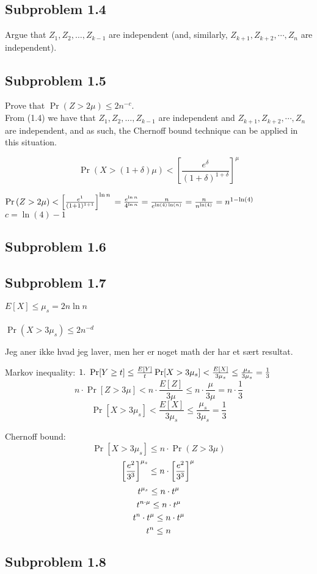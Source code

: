 \documentclass[article,a4paper,oneside]{memoir}
\newcommand{\+}[1]{\ensuremath{\boldsymbol{#1}}}
\begin{document}
\subsection{Subproblem 1.4}
Argue that $Z_1, Z_2, \ldots, Z_{k-1}$ are independent (and, similarly, $Z_{k+1}, Z_{k+2}, \cdots, Z_n$ are independent).

\subsection{Subproblem 1.5}
Prove that $\Pr (Z > 2\mu)\leq 2n^{-c}$.
\\
From (1.4) we have that $Z_1, Z_2, \ldots, Z_{k-1}$ are independent and $Z_{k+1}, Z_{k+2}, \cdots, Z_n$ are independent, and as such, the Chernoff bound technique can be applied in this situation.

$$\Pr \left ( X > (1+\delta)\mu \right ) < \left [ \frac{e^\delta}{(1+\delta)^{1+\delta}} \right ]^\mu$$

$\Pr \left ( Z > 2\mu \right ) < \left [ \frac{e^1}{(1+1)^{1+1}} \right ]^{\ln n}
\\= \frac{e^{\ln n}}{4^{\ln n}} 
\\= \frac {n}{e^{\ln(4)\ln(n)}} 
\\= \frac{n}{n^{\ln(4)}}
\\= n^{1-\ln (4)}$\\
$ c=\ln(4)-1$



\subsection{Subproblem 1.6}

\subsection{Subproblem 1.7}
$E[X] \leq \mu_s = 2n\ln n$
\\\\
$\Pr (X > 3\mu_s) \leq 2n^{-d}$

Jeg aner ikke hvad jeg laver, men her er noget math der har et sært resultat.

Markov inequality:
$
\\1.\ \Pr[Y\geq t]\leq \frac{E[Y]}{t} \\
\Pr[X > 3\mu_s] < \frac{E[X]}{3\mu_s}\leq \frac{\mu_s}{3\mu_s} = \frac{1}{3}\\
$
$$
n \cdot \Pr[Z > 3\mu] < n\cdot \frac{E[Z]}{3\mu}\leq n\cdot \frac{\mu}{3\mu} = n\cdot \frac{1}{3}
$$
$$
\Pr[X>3\mu_s]<\frac{E[X]}{3\mu_s}\leq \frac{\mu_s}{3\mu_s}=\frac{1}{3}
$$

Chernoff bound:
$$
\Pr[X > 3\mu_s]\leq n\cdot \Pr(Z > 3\mu)
$$
$$
\left [\frac{e^2 }{3^3}\right ]^{\mu_s}\leq n\cdot\left [\frac{e^2 }{3^3}\right ]^\mu\\
$$
$$
t^{\mu_s}\leq n\cdot t^\mu\\
$$
$$
t^{n\cdot\mu}\leq n\cdot t^\mu\\
$$
$$
t^{n}\cdot t^\mu\leq n\cdot t^\mu\\
$$
$$
t^{n}\leq n\\
$$
\subsection{Subproblem 1.8}
\end{document}
